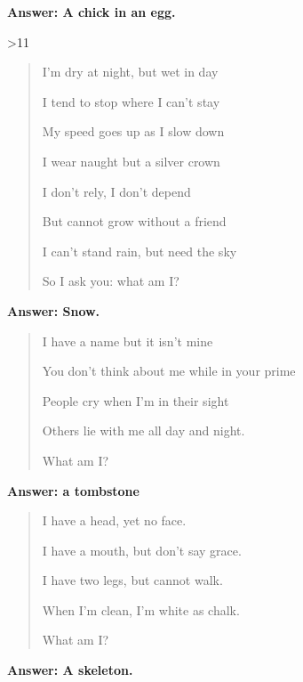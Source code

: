 \begin{multicols}{2}
    \textbf{Answer: A chick in an egg.}
  \fi
\fi

\ifnum\month>11

  \begin{quotation}

  I'm dry at night, but wet in day

  I tend to stop where I can't stay

  My speed goes up as I slow down

  I wear naught but a silver crown

  I don't rely, I don't depend

  But cannot grow without a friend

  I can't stand rain, but need the sky

  So I ask you: what am I?

  \end{quotation}

  \textbf{Answer: Snow.}

\fi


\ifnum{}

  \begin{quotation}
    I have a name but it isn't mine

    You don't think about me while in your prime

    People cry when I'm in their sight

    Others lie with me all day and night.

    What am I?
  \end{quotation}

  \textbf{Answer: a tombstone}

  \begin{quotation}
    I have a head, yet no face.

    I have a mouth, but don't say grace.

    I have two legs, but cannot walk.

    When I'm clean, I'm white as chalk.

    What am I?
  \end{quotation}

  \textbf{Answer: A skeleton.}
\fi

\end{multicols}
